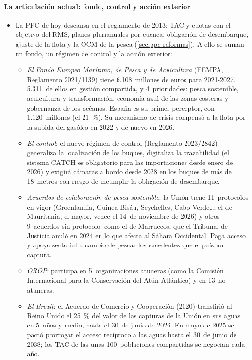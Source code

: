 \documentclass[11pt]{article}
\begin{document}
\paragraph{La articulación actual: fondo, control y acción exterior}

\begin{itemize}
\item La PPC de hoy descansa en el reglamento de 2013: TAC y cuotas con el objetivo del RMS, planes plurianuales por cuenca, obligación de desembarque, ajuste de la flota y la OCM de la pesca (\ref{sec:ppc-reformas}). A ello se suman un fondo, un régimen de control y la acción exterior:
  \begin{itemize}
  \item \emph{El Fondo Europeo Marítimo, de Pesca y de Acuicultura} (FEMPA, Reglamento 2021/1139) tiene 6.108~millones de euros para 2021-2027, 5.311~de ellos en gestión compartida, y 4~prioridades: pesca sostenible, acuicultura y transformación, economía azul de las zonas costeras y gobernanza de los océanos. España es su primer perceptor, con 1.120~millones (el 21~\%)\nocite{UE2021FEMPA}. Su mecanismo de crisis compensó a la flota por la subida del gasóleo en 2022 y de nuevo en 2026.
  \item \emph{El control}: el nuevo régimen de control (Reglamento 2023/2842) generaliza la localización de los buques, digitaliza la trazabilidad (el sistema CATCH es obligatorio para las importaciones desde enero de 2026) y exigirá cámaras a bordo desde 2028 en los buques de más de 18~metros con riesgo de incumplir la obligación de desembarque.
  \item \emph{Acuerdos de colaboración de pesca sostenible}: la Unión tiene 11~protocolos en vigor (Groenlandia, Guinea-Bisáu, Seychelles, Cabo Verde\ldots; el de Mauritania, el mayor, vence el 14~de noviembre de 2026) y otros 9~acuerdos sin protocolo, como el de Marruecos, que el Tribunal de Justicia anuló en 2024 en lo que afecta al Sáhara Occidental. Paga acceso y apoyo sectorial a cambio de pescar los excedentes que el país no captura\nocite{CE2026SFPA}.
  \item \emph{OROP}: participa en 5~organizaciones atuneras (como la Comisión Internacional para la Conservación del Atún Atlántico) y en 13~no atuneras.
  \item \emph{El Brexit}: el Acuerdo de Comercio y Cooperación (2020) transfirió al Reino Unido el 25~\% del valor de las capturas de la Unión en sus aguas en 5~años y medio, hasta el 30~de junio de 2026. En mayo de 2025 se pactó prorrogar el acceso recíproco a las aguas hasta el 30~de junio de 2038; los TAC de las unas 100~poblaciones compartidas se negocian cada año\nocite{CE2025ReinoUnido}.
  \end{itemize}
\end{itemize}
\end{document}
